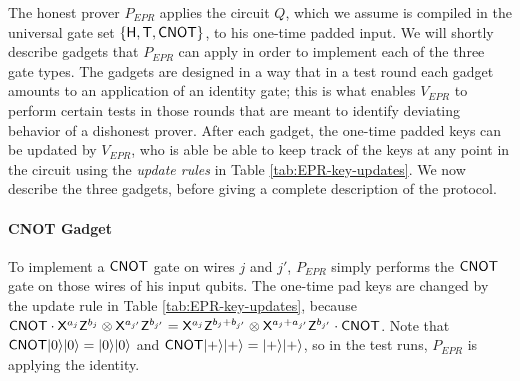 \documentclass[11pt,letter]{article}
\theoremstyle{remark}
\theoremstyle{definition}
\newcommand{\ket}[1]{|#1\rangle}
\begin{document}
The honest prover $P_{EPR}$ applies the circuit $Q$, which we assume is compiled in the universal gate set $\{{\sf H},{\sf T},{\sf CNOT}\}$, to his one-time padded input. We will shortly describe gadgets that $P_{EPR}$ can apply in order to implement each of the three gate types. The gadgets are designed in a way that in a test round each gadget amounts to an application of an identity gate; this is what enables $V_{EPR}$ to perform certain tests in those rounds that are meant to identify deviating behavior of a dishonest prover. After each gadget, the one-time padded keys can be updated by $V_{EPR}$, who is able be able to keep track of the keys at any point in the circuit using the \emph{update rules} in Table \ref{tab:EPR-key-updates}. We now describe the three gadgets, before giving a complete description of the protocol. 


\paragraph{CNOT Gadget} To implement a $\sf CNOT$ gate on wires $j$ and $j'$, $P_{EPR}$ simply performs the $\sf CNOT$ gate on those wires of his input qubits. The one-time pad keys are changed by the update rule in Table \ref{tab:EPR-key-updates}, because ${\sf CNOT}\cdot {\sf X}^{a_j}{\sf Z}^{b_j}\otimes {\sf X}^{a_{j'}}{\sf Z}^{b_{j'}}={\sf X}^{a_j}{\sf Z}^{b_j+b_{j'}}\otimes {\sf X}^{a_j+a_{j'}}{\sf Z}^{b_{j'}}\cdot {\sf CNOT}$. Note that ${\sf CNOT}\ket{0}\ket{0}=\ket{0}\ket{0}$ and ${\sf CNOT}\ket{+}\ket{+}=\ket{+}\ket{+}$, so in the test runs, $P_{EPR}$ is applying the identity. 
\end{document}
